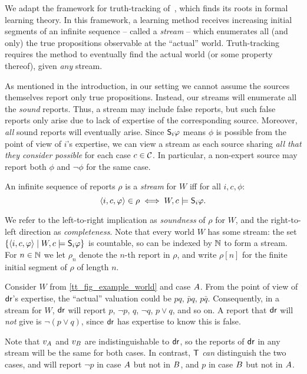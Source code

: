 We adapt the framework for truth-tracking
of~\textcite{Baltag_2016,baltag_tt_2019}, which finds its roots in
formal learning theory. In this framework, a learning method receives
increasing initial segments of an infinite sequence -- called a \emph{stream}
-- which enumerates all (and only) the true propositions observable at the
``actual'' world. Truth-tracking requires the method to eventually find
the actual world (or some property thereof), given \emph{any} stream.

As mentioned in the introduction, in our setting we cannot assume the sources
themselves report only true propositions. Instead, our streams will enumerate
all the \emph{sound} reports. Thus, a stream may include false reports, but
such false reports only arise due to lack of expertise of the corresponding
source.\footnotemark{} Moreover, \emph{all} sound reports will eventually
arise. Since $\S_i\phi$ means $\phi$ is possible from the point of view of
$i$'s expertise, we can view a stream as each source sharing \emph{all that
they consider possible} for each case $c \in \css$. In particular, a non-expert
source may report both $\phi$ and $\neg\phi$ for the same case.


\begin{definition}
    \label{tt_def_stream}
    An infinite sequence of reports $\rho$ is a \emph{stream} for $W$ iff for
    all $i, c, \phi$:
    \[
        \tuple{i, c, \phi} \in \rho \iff W, c \models \S_i\phi.
    \]
\end{definition}

We refer to the left-to-right implication as \emph{soundness} of $\rho$ for
$W$, and the right-to-left direction as \emph{completeness}. Note that every
world $W$ has some stream: the set $\{\tuple{i, c, \phi} \mid W, c \models
\S_i\phi\}$ is countable, so can be indexed by $\N$ to form a stream. For $n
\in \N$ we let $\rho_n$ denote the $n$-th report in $\rho$, and write $\rho[n]$
for the finite initial segment of $\rho$ of length $n$.

\begin{example}
    \label{tt_ex_stream}
    Consider $W$ from \cref{tt_fig_example_world} and case $\patientA{}$. From the
    point of view of $\dr{}$'s expertise, the ``actual'' valuation could be $pq$,
    $\bar{p}q$, $p\bar{q}$. Consequently, in a stream for $W$, $\dr{}$ will
    report $p$, $\neg p$, $q$, $\neg q$, $p \lor q$, and so on. A report that
    $\dr{}$ will \emph{not} give is $\neg (p \lor q)$, since $\dr{}$ has
    expertise to know this is false.

    Note that $v_{\patientA{}}$ and $v_{\patientB{}}$ are indistinguishable to
    $\dr{}$, so the reports of $\dr{}$ in any stream will be the same for both
    cases. In contrast, $\tech{}$ \emph{can} distinguish the two cases, and
    will report $\neg p$ in case $\patientA{}$ but not in $\patientB{}$, and
    $p$ in case $\patientB{}$ but not in $\patientA{}$.
\end{example}

